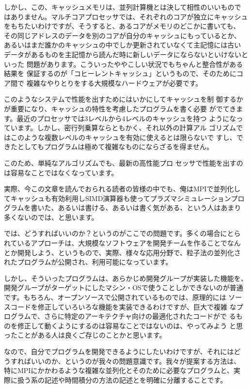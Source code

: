 \documentclass{jspf}            %
\begin{document}
しかし、この、キャッシュメモリは、並列計算機とは決して相性のいいもので
はありません。マルチコアプロセッサでは、それぞれのコアが独立にキャッシュ
をもちたいわけですが、そうすると、あるコアがメモリのどこかに書いても、
その同じアドレスのデータを別のコアが自分のキャッシュにもっているとか、
あるいはまだ誰かのキャッシュの中でしか更新されていなくて主記憶には古い
データがあるものを主記憶から読んだ時に新しいデータにならないといけないといった
問題があります。こういったややこしい状況でもちゃんと整合性がある結果を
保証するのが「コヒーレントキャッシュ」というもので、そのためにコア間で
複雑なやりとりをする大規模なハードウェアが必要です。

このようなシステムで性能を出すためにはいかにしてキャッシュを制
御するかが重要になり、キャッシュの特性を考慮したプログラムを書く必要
がでてきます。最近のプロセッサでは3レベルから4レベルのキャッシュを持つ
ようになっています。しかし、密行列乗算ならともかく、それ以外の計算アル
ゴリズムではこのような複数レベルのキャッシュを有効に使えるとは限らないで
すし、できたとしてもプログラムは極めて複雑なものにならざるを得ません。

このため、単純なアルゴリズムでも、最新の高性能プロ
セッサで性能を出すのは容易なことではなくなっています。

実際、今この文章を読んでおられる読者の皆様の中でも、俺はMPIで並列化し
てキャッシュも有効利用しSIMD演算器も使ってプラズマシミュレーションプロ
グラムを書いた、あるいは書ける、あるいは書く気がある、という人はあまり
多くないのでは、と思います。

では、どうすればいいのか？というのがここでの問題です。多くの場合にとら
れているアプローチは、大規模なソフトウェアを開発チームを作ることでなん
とか開発しよう、というもので、実際、様々な応用分野で、粒子法の並列化さ
れたプログラムが公開され、利用可能になっています。

しかし、そういったプログラムは、あらかじめ開発グループが実装した機能を、
開発グループがターゲットにしたマシン・OSで使うことしかできないのが普通
です。もちろん、オープンソースで公開されているものでは、原理的には
ソースコードを修正していろいろな機能を実装できるわけですが、巨大で複雑
なプログラムで、さらに特定のアーキテクチャ向けの最適化されたコードがで
るものを修正して動くようにするのは容易なことではないのは、やってみよう
と思ったことがある人は良くご存じのことかと思います。

なので、自分でプログラムを開発できるようにしたいわけですが、それにはど
うすればいいのか、というのが我々の問題意識です。我々が提案する方法は、
特にMPIにかかわるような複雑な並列化とそのために必要なプログラムと、実
際に扱う系の記述や時間積分の方法の記述とを明確に分離することです。
\end{document}

